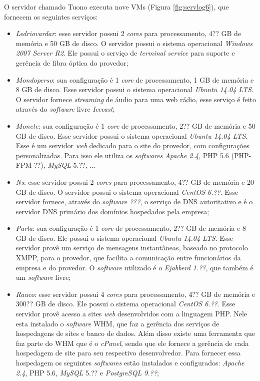 O servidor chamado Tuono executa nove \ac{VM}s (Figura \ref{fig:servlog6}), que fornecem os seguintes serviços:
\begin{itemize}
 \item \textit{Ledriovardar}: esse servidor possui 2 \textit{cores} para processamento, 4?? GB de memória e 50 GB de disco. O servidor possui 
 o sistema operacional \textit{Windows 2007 Server R2}. Ele possui o serviço de \textit{terminal service} para suporte e gerência de fibra 
 óptica do provedor;
 
 \item \textit{Mondoperso}: sua configuração é 1 \textit{core} de processamento, 1 GB de memória e 8 GB de disco. Esse servidor possui o 
 sistema operacional \textit{Ubuntu 14.04 \ac{LTS}}. O servidor fornece \textit{streaming} de áudio para uma web rádio, esse serviço é feito
 através do \textit{software} livre \textit{Icecast};
 
 \item \textit{Monete}: sua configuração é 1 \textit{core} de processamento, 2?? GB de memória e 50 GB de disco. Esse servidor possui o 
 sistema operacional \textit{Ubuntu 14.04 \ac{LTS}}. Esse é um servidor \textit{web} dedicado para o site do provedor, com configurações
 personalizadas. Para isso ele utiliza os \textit{softwares} \textit{Apache 2.4}, \ac{PHP} 5.6 (PHP-FPM ??), \textit{MySQL} 5.??, ...
 
 \item \textit{Ns}: esse servidor possui 2 \textit{cores} para processamento, 4?? GB de memória e 20 GB de disco. O servidor possui 
 o sistema operacional \textit{CentOS 6.??}. Esse servidor fornece, através do \textit{software} \textit{???}, o serviço de \ac{DNS} autoritativo 
 e é o servidor \ac{DNS} primário dos domínios hospedados pela empresa;
 
 \item \textit{Parla}: sua configuração é 1 \textit{core} de processamento, 2?? GB de memória e 8 GB de disco. Ele possui o sistema
 operacional \textit{Ubuntu 14.04 \ac{LTS}}. Esse servidor provê um serviço de mensagens instantâneas, baseado no protocolo \ac{XMPP}, para
 o provedor, que facilita a comunicação entre funcionários da empresa e do provedor. O \textit{software} utilizado é o \textit{Ejabberd 1.??},
 que também é um \textit{software} livre;
 
 \item \textit{Rauco}: esse servidor possui 4 \textit{cores} para processamento, 4?? GB de memória e 300?? GB de disco. Ele possui o sistema
 operacional \textit{CentOS 6.??}. Esse servidor provê acesso a sites \textit{web} desenvolvidos com a linguagem \ac{PHP}. Nele esta instalado o 
 \textit{software} \ac{WHM}, que faz a gerência dos serviços de hospedagens de sites e banco de dados. Além disso existe uma ferramenta que 
 faz parte do \ac{WHM} que é o \textit{cPanel}, sendo que ele fornece a gerência de cada hospedagem de site para seu respectivo desenvolvedor.
 Para fornecer essa hospedagem os seguintes \textit{softwares} estão instalados e configurados: \textit{Apache 2.4}, \ac{PHP} 5.6, 
 \textit{MySQL} 5.?? e \textit{PostgreSQL 9.??};
 

\end{itemize}
